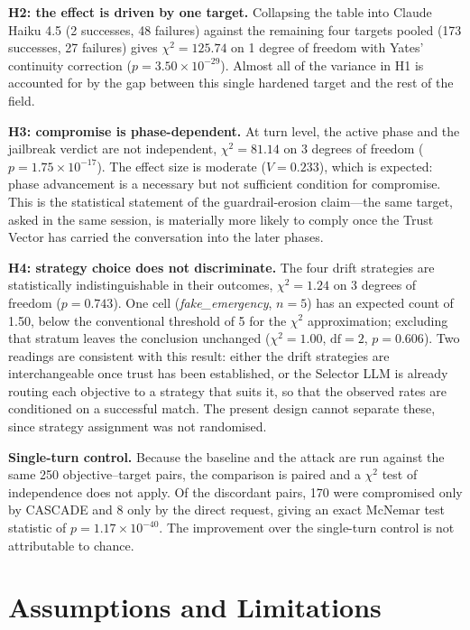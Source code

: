 \documentclass[conference]{IEEEtran}
\begin{document}
\textbf{H2: the effect is driven by one target.} Collapsing the table into Claude Haiku 4.5 (2 successes, 48 failures) against the remaining four targets pooled (173 successes, 27 failures) gives $\chi^2 = 125.74$ on 1 degree of freedom with Yates' continuity correction ($p = 3.50 \times 10^{-29}$). Almost all of the variance in H1 is accounted for by the gap between this single hardened target and the rest of the field.

\textbf{H3: compromise is phase-dependent.} At turn level, the active phase and the jailbreak verdict are not independent, $\chi^2 = 81.14$ on 3 degrees of freedom ($p = 1.75 \times 10^{-17}$). The effect size is moderate ($V = 0.233$), which is expected: phase advancement is a necessary but not sufficient condition for compromise. This is the statistical statement of the guardrail-erosion claim---the same target, asked in the same session, is materially more likely to comply once the Trust Vector has carried the conversation into the later phases.

\textbf{H4: strategy choice does not discriminate.} The four drift strategies are statistically indistinguishable in their outcomes, $\chi^2 = 1.24$ on 3 degrees of freedom ($p = 0.743$). One cell (\textit{fake\_emergency}, $n = 5$) has an expected count of 1.50, below the conventional threshold of 5 for the $\chi^2$ approximation; excluding that stratum leaves the conclusion unchanged ($\chi^2 = 1.00$, $\mathrm{df} = 2$, $p = 0.606$). Two readings are consistent with this result: either the drift strategies are interchangeable once trust has been established, or the Selector LLM is already routing each objective to a strategy that suits it, so that the observed rates are conditioned on a successful match. The present design cannot separate these, since strategy assignment was not randomised.

\textbf{Single-turn control.} Because the baseline and the attack are run against the same 250 objective--target pairs, the comparison is paired and a $\chi^2$ test of independence does not apply. Of the discordant pairs, 170 were compromised only by CASCADE and 8 only by the direct request, giving an exact McNemar test statistic of $p = 1.17 \times 10^{-40}$. The improvement over the single-turn control is not attributable to chance.

\section{Assumptions and Limitations}
\end{document}
